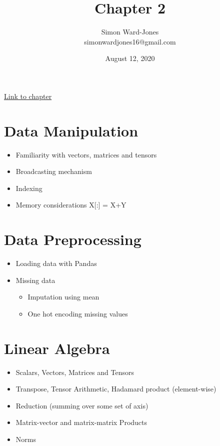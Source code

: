 \documentclass[12pt,notitlepage]{article}
\begin{document}


\title{\Large{\textbf{Chapter 2}}}
\date{August 12, 2020}
\author{Simon Ward-Jones\\simonwardjones16@gmail.com}

\maketitle
\href{https://d2l.ai/chapter_preliminaries/index.html}{Link to chapter}

\section{Data Manipulation}
\begin{itemize}
    \item Familiarity with vectors, matrices and tensors
    \item Broadcasting mechanism
    \item Indexing
    \item Memory considerations X[:] = X+Y 
\end{itemize}

\section{Data Preprocessing}
\begin{itemize}
    \item Loading data with Pandas
    \item Missing data
    \begin{itemize}
        \item Imputation using mean
        \item One hot encoding missing values
    \end{itemize}
\end{itemize}

\section{Linear Algebra}
\begin{itemize}
    \item Scalars, Vectors, Matrices and Tensors
    \item Transpose, Tensor Arithmetic, Hadamard product (element-wise)
    \item Reduction (summing over some set of axis)
    \item Matrix-vector and matrix-matrix Products
    \item Norms
\end{itemize}

\vfill

\nocite{zhang2020dive}
\end{document}
